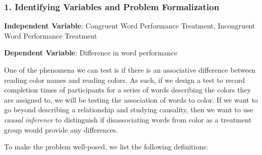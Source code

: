 \documentclass[11pt]{article}
\begin{document}
    \hypertarget{identifying-variables-and-problem-formalization}{%
\subsubsection{1. Identifying Variables and Problem
Formalization}\label{identifying-variables-and-problem-formalization}}

    \textbf{Independent Variable}: Congruent Word Performance Treatment,
Incongruent Word Performance Treatment

\textbf{Dependent Variable}: Difference in word performance

One of the phenomena we can test is if there is an associative
difference between reading color names and reading colors. As such, if
we design a test to record completion times of participants for a series
of words describing the colors they are assigned to, we will be testing
the association of words to color. If we want to go beyond describing a
relationship and studying causality, then we want to use \emph{causal
inference} to distinguish if disassociating words from color as a
treatment group would provide any differences.

To make the problem well-posed, we list the following definitions:
\end{document}
